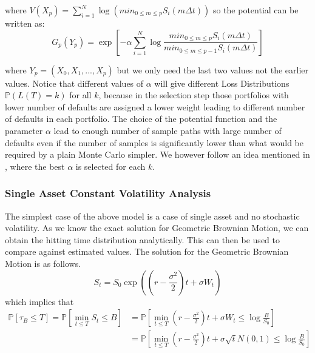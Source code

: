 where $V(X_p) = \sum_{i=1}^N \log (min_{0\leq m  \leq p}S_{i}(m \Delta t))$ 
so the potential can be written as:
\begin{equation}
	G_{p}(Y_{p})= \exp\left[ -\alpha \sum_{i=1}^{N}\log\frac{min_{0\leq m  \leq p}
		S_{i}(m \Delta t)}{min_{0\leq m  \leq p - 1}S_{i}(m \Delta t)}\right]
\end{equation}

where $Y_{p} =(X_{0},X_{1},...,X_{p})$ but we only need the last two values 
not the earlier values. Notice that different values of $\alpha$ will give 
different Loss Distributions $\mathbb{P}(L(T) = k)$ for all $k$, because in 
the selection step those portfolios with lower number of defaults are assigned 
a lower weight leading to different number of defaults in each portfolio. The 
choice of the potential function and the parameter $\alpha$ lead to enough 
number of sample paths with large number of defaults even if the number of 
samples is significantly lower than what would be required by a plain Monte 
Carlo simpler. We however follow an idea mentioned in 
\cite{carmona2009importance}, where the best $\alpha$ is selected for each $k$.

\subsubsection{Single Asset Constant Volatility Analysis}
\label{subsubsec:single_asset}
The simplest case of the above model is a case of single asset and no stochastic
volatility. As we know the exact solution for Geometric Brownian Motion, we can 
obtain the hitting time distribution analytically. This can then be used to
compare against estimated values. The solution for the Geometric Brownian Motion
is as follows.
\begin{equation}
	S_t = S_0 \exp \left( \left( r - \frac{\sigma^2}{2} \right) t  + \sigma W_t\right)
\end{equation}
which implies that
\begin{equation}
	\begin{split}
		\mathbb{P}[\tau_B \leq T] = \mathbb{P}[\min_{t\leq T} S_t \leq B] 
		&= \mathbb{P}[\min_{t\leq T} (r - \frac{\sigma^2}{2}) t  + \sigma W_t \leq 
		\log \frac{B}{S_0}] \\
		&= \mathbb{P}[\min_{t\leq T} (r - \frac{\sigma^2}{2}) t  + \sigma \sqrt{t} 
		N(0,1) \leq \log \frac{B}{S_0}]
	\end{split}
\end{equation}

